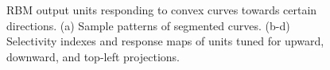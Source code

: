 \documentclass[twocolumn]{article}
\begin{document}
\begin{figure}
\centering
{}\hfil
{}\hfil
{}\hfil
{}
\caption{RBM output units responding to convex curves towards certain directions.
(a) Sample patterns of segmented curves.
(b-d) Selectivity indexes and response maps of units tuned for upward, downward, and top-left projections. }
\label{fig:8}
\end{figure}
\end{document}
